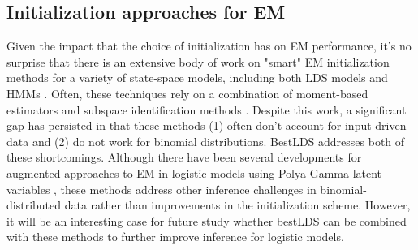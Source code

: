 \subsection{Initialization approaches for EM}
\label{sec:bestlds:background:initialization}

Given the impact that the choice of initialization has on EM performance, it's no surprise that there is an extensive body of work on "smart" EM initialization methods for a variety of state-space models, including both LDS models \cite{buesing_spectral_2012, hazan_learning_2017, hazan_spectral_2018} and HMMs \cite{siddiqi_reduced-rank_2010, hsu_spectral_2012, anandkumar_tensor_2014, liu_efficient_2017, mattila_identification_2017}. Often, these techniques rely on a combination of moment-based estimators \cite{martens_learning_2010, buesing_spectral_2012, hsu_spectral_2012, anandkumar_tensor_2014, mattila_identification_2017} and subspace identification methods \cite{ho_editorial_1966, van_overschee_n4sid_1994, viberg_subspace-based_1995, van_overschee_subspace_1996, andersson_subspace_2009, qin_overview_2006}. Despite this work, a significant gap has persisted in that these methods (1) often don't account for input-driven data and (2) do not work for binomial distributions. BestLDS addresses both of these shortcomings. Although there have been several developments for augmented approaches to EM in logistic models using Polya-Gamma latent variables \cite{polson_bayesian_2013, schein_poisson-gamma_2016}, these methods address other inference challenges in binomial-distributed data rather than improvements in the initialization scheme. However, it will be an interesting case for future study whether bestLDS can be combined with these methods to further improve inference for logistic models.